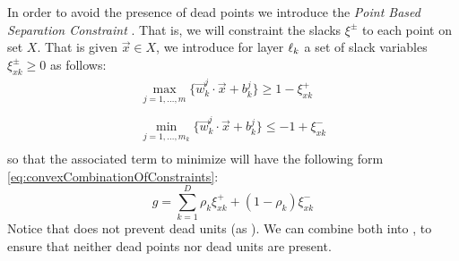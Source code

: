 In order to avoid the presence of dead points we introduce the \emph{Point Based Separation Constraint} \SepPoint. That is, we will constraint the slacks $\xi^{\pm}$ to each point on set $X$. That is given $\vec{x}\in X$, we introduce for layer $\ell_k$ a set of slack variables $\xi^{\pm}_{xk}\geq 0$ as follows:
\begin{equation}\label{eq:pointSeparationConstraint}
\begin{array}{lcl}
    \displaystyle\max_{j=1,\ldots,m}\{\vec{w}^j_k\cdot\vec{x}+b^j_k\}\geq 1-\xi^{+}_{xk}\\\\
    \displaystyle\min_{j=1,\ldots,m_k}\{\vec{w}^j_k\cdot\vec{x}+b^j_k\}\leq -1+\xi^{-}_{xk}\\
\end{array}    
\end{equation}
so that the associated term to minimize will have the following form \ref{eq:convexCombinationOfConstraints}:
\begin{equation}\label{eq:convexCombinationOfConstraints}
    g = \sum_{k=1}^{D}\rho_{k}\xi^{+}_{xk}+(1-\rho_{k})\xi^{-}_{xk}
\end{equation}
Notice that \SepPoint does not prevent  dead units (as \SepUnit). We can combine both into \SepUnitPoint, to ensure that neither dead points nor dead units are present. 

